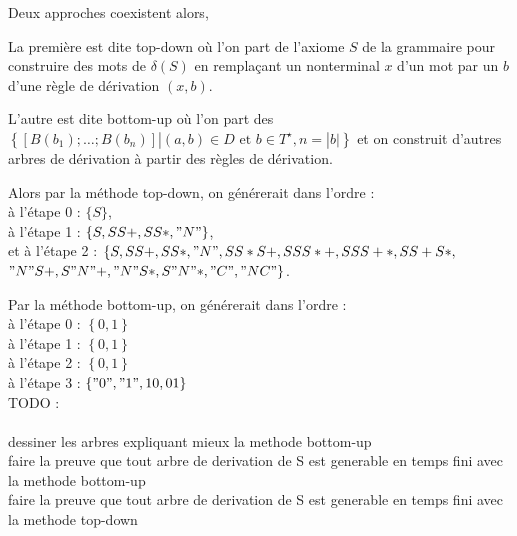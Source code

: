 \documentclass[a4paper,10pt]{article}
\begin{document}
Deux approches coexistent alors, 

La première est dite top-down où l'on part de l'axiome $S$ de la grammaire pour construire des mots de $\delta(S)$ en remplaçant un nonterminal $x$ d'un mot par un $b$ d'une règle de dérivation $(x,b)$.

L'autre est dite bottom-up où l'on part des $\left\{ [B(b_1);\dots;B(b_n)] | (a,b)\in D \text{ et } b \in T^\star , n = |b|\right\}$ et on construit d'autres arbres de dérivation à partir des règles de dérivation.

Alors par la méthode top-down, on générerait dans l'ordre :\\
à l'étape 0 : $\{S\}$, \\
à l'étape 1 : $\{S,SS+,SS*,"N"\}$,\\
et à l'étape 2 : $\{S,SS+,SS*,"N",SS*S+,SSS*+,SSS+*,SS+S*,$ \\
$"N"S+,S"N"+,"N"S*,S"N"*,"C","NC"\}$.

Par la méthode bottom-up, on générerait dans l'ordre :\\
à l'étape 0 : $\left\{0,1\right\}$\\
à l'étape 1 : $\left\{0,1\right\}$\\
à l'étape 2 : $\left\{0,1\right\}$\\
à l'étape 3 : $\left\{"0","1",10,01\right\}$\\

{\color{red} TODO :\\\\  
    dessiner les arbres expliquant mieux la methode bottom-up\\
    faire la preuve que tout arbre de derivation de S est generable en temps fini avec la methode bottom-up\\
    faire la preuve que tout arbre de derivation de S est generable en temps fini avec la methode top-down\\
 }\\
\end{document}
